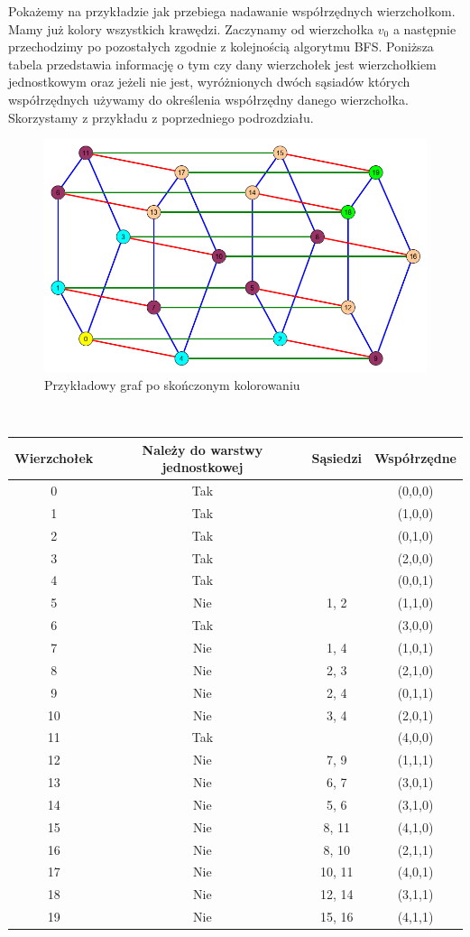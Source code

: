 \documentclass[12pt,a4paper,titlepage]{article}
\begin{document}
Pokażemy na przykładzie jak przebiega nadawanie współrzędnych wierzchołkom. Mamy już kolory wszystkich krawędzi. Zaczynamy od wierzchołka $v_0$ a następnie przechodzimy po pozostałych zgodnie z kolejnością algorytmu BFS. Poniższa tabela przedstawia informację o tym czy dany wierzchołek jest wierzchołkiem jednostkowym oraz jeżeli nie jest, wyróżnionych dwóch sąsiadów których współrzędnych używamy do określenia współrzędny danego wierzchołka. Skorzystamy z przykładu z poprzedniego podrozdziału.\\
\begin{figure}[h]
\centering
\includegraphics[width = 11.5cm]{kol5.png}
\caption{Przykładowy graf po skończonym kolorowaniu}
\end{figure}
\\
\begin{tabular}{|c|c|c|c|}\hline
\textbf{Wierzchołek} & \textbf{Należy do warstwy jednostkowej} & \textbf{Sąsiedzi} & \textbf{Współrzędne} \\ \hline
0 & Tak & & (0,0,0)\\ \hline
1 & Tak & & (1,0,0)\\ \hline
2 & Tak & & (0,1,0)\\ \hline
3 & Tak & & (2,0,0)\\ \hline
4 & Tak & & (0,0,1)\\ \hline
5 & Nie & 1, 2 & (1,1,0)\\ \hline
6 & Tak & & (3,0,0)\\ \hline
7 & Nie & 1, 4 & (1,0,1)\\ \hline
8 & Nie & 2, 3 & (2,1,0)\\ \hline
9 & Nie & 2, 4 & (0,1,1)\\ \hline
10 & Nie & 3, 4 & (2,0,1)\\ \hline
11& Tak & & (4,0,0)\\ \hline
12& Nie & 7, 9 & (1,1,1)\\ \hline
13& Nie & 6, 7 & (3,0,1)\\ \hline
14& Nie & 5, 6 & (3,1,0)\\ \hline
15& Nie & 8, 11 & (4,1,0)\\ \hline
16& Nie & 8, 10& (2,1,1)\\ \hline
17& Nie & 10, 11 & (4,0,1)\\ \hline
18& Nie & 12, 14 & (3,1,1)\\ \hline
19& Nie & 15, 16 & (4,1,1)\\ \hline
\end{tabular}
\newpage
\end{document}
